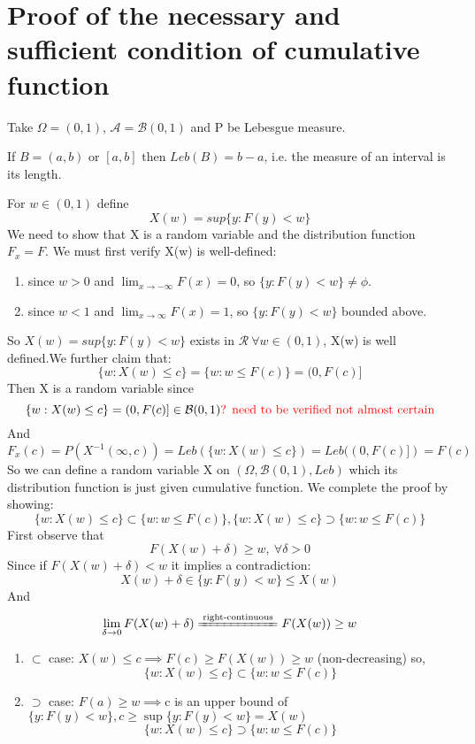 \documentclass[Probability_Theory.tex]{subfiles}
\begin{document}
\section{Proof of the necessary and sufficient condition of cumulative function}\label{sec:proofcfnscondition}

Take $\Omega=(0,1)$, $\mathcal{A}=\mathcal{B}(0,1)$ and P be Lebesgue measure.
\begin{remark}
If $B=(a,b)\text{ or }[a,b] \text{ then } Leb(B)=b-a$, i.e. the measure of an interval is its length.
\end{remark}
For $w\in(0,1)$ define $$X(w)=sup\{y:F(y)<w\}$$
We need to show that X is a random variable and the distribution function $F_x=F$.
We must first verify X(w) is well-defined:
\begin{enumerate}
\item since $w>0$ and $\lim_{x\rightarrow -\infty}F(x)=0$, so $\{y:F(y)<w\}\neq\phi$.
\item since $w<1$ and $\lim_{x\rightarrow \infty}F(x)=1$, so $\{y:F(y)<w\}$ bounded above.
\end{enumerate}
So $X(w)=sup\{y:F(y)<w\}$ exists in $\mathcal{R} \ \forall w\in(0,1)$, X(w) is well defined.We further claim that:
$$\{w:X(w)\leq c\}=\{w:w\leq F(c)\}=(0,F(c)]$$ 
Then X is a random variable since $$\{w:X(w)\leq c\}=(0,F(c)]\in \mathcal{B}(0,1) \text{\textcolor{red}{? need to be verified not almost certain}} $$
And $$F_x(c)=P(X^{-1}(\infty,c))=Leb(\{w:X(w)\leq c\})=Leb((0,F(c)])=F(c)$$
So we can define a random variable X on $(\Omega,\mathcal{B}(0,1),Leb)$ which its distribution function is just given cumulative function. We complete the proof by showing:
$$\{w:X(w)\leq c\}\subset\{w:w\leq F(c)\},\{w:X(w)\leq c\}\supset\{w:w\leq F(c)\}$$
First observe that $$F(X(w)+\delta)\geq w,\ \forall \delta>0$$ Since if $F(X(w)+\delta)<w$ it implies a contradiction: $$X(w)+\delta\in\{y:F(y)<w\}\leq X(w)$$ And $$\lim_{\delta\rightarrow 0}F(X(w)+\delta)\xlongequal{\text{right-continuous}}F(X(w))\geq w$$  
\begin{enumerate}
\item $\subset$ case: $X(w)\leq c\implies F(c)\geq F(X(w))\geq w $ (non-decreasing) so, 
 $$\{w:X(w)\leq c\}\subset\{w:w\leq F(c)\}$$
\item $\supset$ case: $F(a)\geq w\implies$c is an upper bound of $\{y:F(y)<w\}, c\geq\sup\{y:F(y)<w\}=X(w)$
 $$\{w:X(w)\leq c\}\supset\{w:w\leq F(c)\}$$

\end{enumerate}
\end{document}
